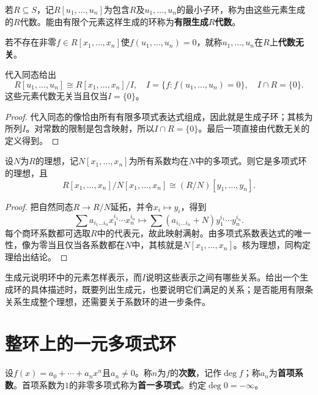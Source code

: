 \begin{definition}
若$R\subseteq S$，记$R[u_1,\ldots,u_n]$为包含$R$及$u_1,\ldots,u_n$的最小子环，称为由这些元素生成的$R$代数。能由有限个元素这样生成的环称为\textbf{有限生成$R$代数}。

若不存在非零$f\in R[x_1,\ldots,x_n]$使$f(u_1,\ldots,u_n)=0$，就称$u_1,\ldots,u_n$在$R$上\textbf{代数无关}。
\end{definition}

\begin{corollary}
代入同态给出
\[
R[u_1,\ldots,u_n]\cong R[x_1,\ldots,x_n]/I,
\quad I=\{f:f(u_1,\ldots,u_n)=0\},\quad I\cap R=\{0\}.
\]
这些元素代数无关当且仅当$I=\{0\}$。
\end{corollary}
\begin{proof}
代入同态的像恰由所有有限多项式表达式组成，因此就是生成子环；其核为所列$I$。对常数的限制是包含映射，所以$I\cap R=\{0\}$。最后一项直接由代数无关的定义得到。
\end{proof}

\begin{proposition}
设$N$为$R$的理想，记$N[x_1,\ldots,x_n]$为所有系数均在$N$中的多项式。则它是多项式环的理想，且
\[
R[x_1,\ldots,x_n]/N[x_1,\ldots,x_n]
\cong(R/N)[y_1,\ldots,y_n].
\]
\end{proposition}
\begin{proof}
把自然同态$R\to R/N$延拓，并令$x_i\mapsto y_i$，得到
\[
\sum a_{i_1\ldots i_n}x_1^{i_1}\cdots x_n^{i_n}
\longmapsto
\sum(a_{i_1\ldots i_n}+N)y_1^{i_1}\cdots y_n^{i_n}.
\]
每个商环系数都可选取$R$中的代表元，故此映射满射。由多项式系数表达式的唯一性，像为零当且仅当各系数都在$N$中，其核就是$N[x_1,\ldots,x_n]$。核为理想，同构定理给出结论。
\end{proof}

生成元说明环中的元素怎样表示，而$I$说明这些表示之间有哪些关系。给出一个生成环的具体描述时，既要列出生成元，也要说明它们满足的关系；是否能用有限条关系生成整个理想，还需要关于系数环的进一步条件。


\section{整环上的一元多项式环}

\begin{definition}
设$f(x)=a_0+\cdots+a_nx^n$且$a_n\ne0$。称$n$为$f$的\textbf{次数}，记作$\deg f$；称$a_n$为\textbf{首项系数}。首项系数为$1$的非零多项式称为\textbf{首一多项式}。约定$\deg0=-\infty$。
\end{definition}

